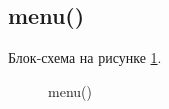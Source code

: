 \subsection{menu()}

Блок-схема на рисунке \ref{fig:menu}.

\begin{figure}[h]
    \caption{menu()}
    \label{fig:menu}
\end{figure}





\newpage